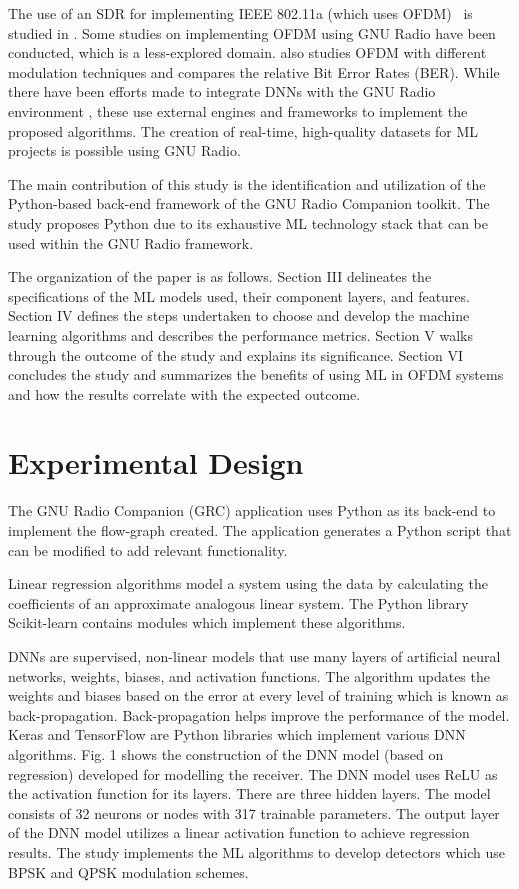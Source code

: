 \documentclass[conference]{IEEEtran}
\begin{document}
The use of an SDR for implementing IEEE 802.11a (which uses OFDM)  is studied in \cite{b6}. Some studies on implementing OFDM using GNU Radio \cite{b7} have been conducted, which is a less-explored domain. \cite{b8} also studies OFDM with different modulation techniques and compares the relative Bit Error Rates (BER). While there have been efforts made to integrate DNNs with the GNU Radio environment \cite{b9}, these use external engines and frameworks to implement the proposed algorithms. The creation of real-time, high-quality datasets for ML projects\cite{b10} is possible using GNU Radio.

The main contribution of this study is the identification and utilization of the Python-based back-end framework of the GNU Radio Companion toolkit. The study proposes Python due to its exhaustive ML technology stack that can be used within the GNU Radio framework.

The organization of the paper is as follows. Section III delineates the specifications of the ML models used, their component layers, and features. Section IV defines the steps undertaken to choose and develop the machine learning algorithms and describes the performance metrics. Section V walks through the outcome of the study and explains its significance. Section VI concludes the study and summarizes the benefits of using ML in OFDM systems and how the results correlate with the expected outcome.

\section{Experimental Design}
The GNU Radio Companion (GRC) application uses Python as its back-end to implement the flow-graph created. The application generates a Python script that can be modified to add relevant functionality.

Linear regression algorithms model a system using the data by calculating the coefficients of an approximate analogous linear system. The Python library Scikit-learn contains modules which implement these algorithms.

DNNs are supervised, non-linear models that use many layers of artificial neural networks, weights, biases, and activation functions. The algorithm updates the weights and biases based on the error at every level of training which is known as back-propagation. Back-propagation helps improve the performance of the model. Keras and TensorFlow are Python libraries which implement various DNN algorithms. Fig. 1 shows the construction of the DNN model (based on regression) developed for modelling the receiver. The DNN model uses ReLU as the activation function for its layers. There are three hidden layers. The model consists of 32 neurons or nodes with 317 trainable parameters. The output layer of the DNN model utilizes a linear activation function to achieve regression results. The study implements the ML algorithms to develop detectors which use BPSK and QPSK modulation schemes.
\end{document}
